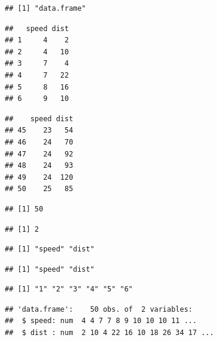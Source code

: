 \documentclass[krantz2]{krantz}\usepackage{knitr}
\begin{document}
\begin{knitrout}\footnotesize
{}\color{fgcolor}\begin{kframe}
\begin{alltt}
\end{alltt}
\begin{verbatim}
## [1] "data.frame"
\end{verbatim}
\begin{alltt}
\end{alltt}
\begin{verbatim}
##   speed dist
## 1     4    2
## 2     4   10
## 3     7    4
## 4     7   22
## 5     8   16
## 6     9   10
\end{verbatim}
\begin{alltt}
\end{alltt}
\begin{verbatim}
##    speed dist
## 45    23   54
## 46    24   70
## 47    24   92
## 48    24   93
## 49    24  120
## 50    25   85
\end{verbatim}
\begin{alltt}
\end{alltt}
\begin{verbatim}
## [1] 50
\end{verbatim}
\begin{alltt}
\end{alltt}
\begin{verbatim}
## [1] 2
\end{verbatim}
\begin{alltt}
\end{alltt}
\begin{verbatim}
## [1] "speed" "dist"
\end{verbatim}
\begin{alltt}
\end{alltt}
\begin{verbatim}
## [1] "speed" "dist"
\end{verbatim}
\begin{alltt}
\hlstd{(}
\end{alltt}
\begin{verbatim}
## [1] "1" "2" "3" "4" "5" "6"
\end{verbatim}
\begin{alltt}
\end{alltt}
\begin{verbatim}
## 'data.frame':	50 obs. of  2 variables:
##  $ speed: num  4 4 7 7 8 9 10 10 10 11 ...
##  $ dist : num  2 10 4 22 16 10 18 26 34 17 ...
\end{verbatim}
\end{kframe}
\end{knitrout}
\end{document}
